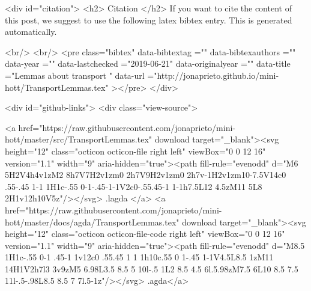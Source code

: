 {{  
  <div id="citation">
  <h2> Citation </h2>
  If you want to cite the content of this post,
  we suggest to use the following latex bibtex entry.
  This is generated automatically.

  <br/>
  <br/>
  <pre class="bibtex"
       data-bibtextag =""
       data-bibtexauthors =""
       data-year =""
       data-lastchecked ="2019-06-21"
       data-originalyear =""
       data-title ="Lemmas about transport "
       data-url ="http://jonaprieto.github.io/mini-hott/TransportLemmas.tex"
  ></pre>
  </div>
  

  <div id="github-links">
    <div class="view-source">
      
        <a href="https://raw.githubusercontent.com/jonaprieto/mini-hott/master/src/TransportLemmas.tex" download target="_blank"><svg height="12" class="octicon octicon-file right left" viewBox="0 0 12 16" version="1.1" width="9" aria-hidden="true"><path fill-rule="evenodd" d="M6 5H2V4h4v1zM2 8h7V7H2v1zm0 2h7V9H2v1zm0 2h7v-1H2v1zm10-7.5V14c0 .55-.45 1-1 1H1c-.55 0-1-.45-1-1V2c0-.55.45-1 1-1h7.5L12 4.5zM11 5L8 2H1v12h10V5z"/></svg> .lagda </a>
        <a href="https://raw.githubusercontent.com/jonaprieto/mini-hott/master/docs/agda/TransportLemmas.tex" download target="_blank"><svg height="12" class="octicon octicon-file-code right left" viewBox="0 0 12 16" version="1.1" width="9" aria-hidden="true"><path fill-rule="evenodd" d="M8.5 1H1c-.55 0-1 .45-1 1v12c0 .55.45 1 1 1h10c.55 0 1-.45 1-1V4.5L8.5 1zM11 14H1V2h7l3 3v9zM5 6.98L3.5 8.5 5 10l-.5 1L2 8.5 4.5 6l.5.98zM7.5 6L10 8.5 7.5 11l-.5-.98L8.5 8.5 7 7l.5-1z"/></svg> .agda</a>
      
}}
